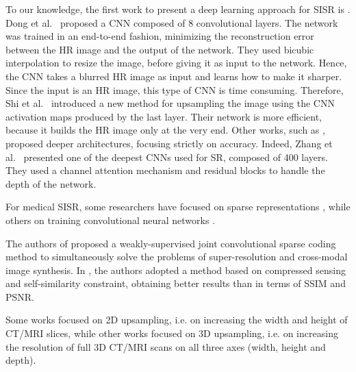 \documentclass{ieeeaccess}
\begin{document}
To our knowledge, the first work to present a deep learning approach for SISR is \cite{Dong-TPAMI-2016}. Dong et al.~\cite{Dong-TPAMI-2016} proposed a CNN composed of 8 convolutional layers. The network was trained in an end-to-end fashion, minimizing the reconstruction error between the HR image and the output of the network. They used bicubic interpolation to resize the image, before giving it as input to the network. Hence, the CNN takes a blurred HR image as input and learns how to make it sharper. Since the input is an HR image, this type of CNN is time consuming. Therefore, Shi et al.~\cite{Shi-CVPR-2016} introduced a new method for upsampling the image using the CNN activation maps produced by the last layer. Their network is more efficient, because it builds the HR image only at the very end. Other works, such as \cite{Zhang-ECCV-2018}, proposed deeper architectures, focusing strictly on accuracy. Indeed, Zhang et al.~\cite{Zhang-ECCV-2018} presented one of the deepest CNNs used for SR, composed of 400 layers. They used a channel attention mechanism and residual blocks to handle the depth of the network. 

For medical SISR, some researchers have focused on sparse representations \cite{Huang-CVPR-2017, Li-Access-2019}, while others on training convolutional neural networks \cite{Sert-MH-2019, Chen-MICCAI-2018, Du-AS-2019, Du-BIBM-2018, Du-NC-2019, Hatvani-TRPMS-2018, Hatvani-TMI-2018, Jurek-BBE-2019, Mahapatra-CMIG-2019, Oktay-MICCAI-2016, Shi-JBHI-2018, You-TMI-2019, Yu-ICIP-2017, Zhao-TMI-2019}. 

The authors of \cite{Huang-CVPR-2017} proposed a weakly-supervised joint convolutional sparse coding method to simultaneously solve the problems of super-resolution and cross-modal image synthesis. In \cite{Li-Access-2019}, the authors adopted a method based on compressed sensing and self-similarity constraint, obtaining better results than \cite{ZENG-CBM-2018} in terms of SSIM and PSNR.

Some works \cite{Sert-MH-2019, Du-AS-2019, Du-NC-2019, Hatvani-TRPMS-2018, Jurek-BBE-2019, Mahapatra-CMIG-2019, Li-Access-2019, Shi-JBHI-2018, You-TMI-2019, Yu-ICIP-2017, Zhao-TMI-2019} focused on 2D upsampling, i.e. on increasing the width and height of CT/MRI slices, while other works \cite{Chen-MICCAI-2018, Du-BIBM-2018, Huang-CVPR-2017, Oktay-MICCAI-2016} focused on 3D upsampling, i.e. on increasing the resolution of full 3D CT/MRI scans on all three axes (width, height and depth). 
  
\end{document}
